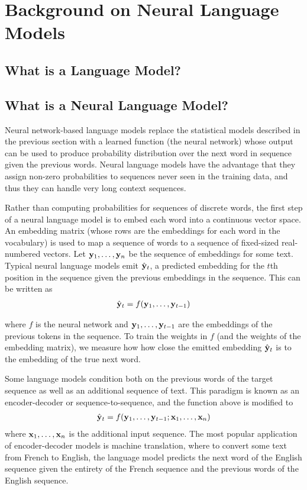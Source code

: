 \chapter{Background on Neural Language Models}
\label{chap:background}

\section{What is a Language Model?}

\section{What is a Neural Language Model?}

Neural network-based language models replace the statistical models described in the previous section with a learned function (the neural network) whose output can be used to produce probability distribution over the next word in sequence given the previous words.
Neural language models have the advantage that they assign non-zero probabilities to sequences never seen in the training data, and thus they can handle very long context sequences.

Rather than computing probabilities for sequences of discrete words, the first step of a neural language model is to embed each word into a continuous vector space.
An embedding matrix (whose rows are the embeddings for each word in the vocabulary) is used to map a sequence of words to a sequence of fixed-sized real-numbered vectors.
Let $\mathbf{y}_1, \ldots, \mathbf{y}_n$ be the sequence of embeddings for some text.
Typical neural language models emit $\hat{\mathbf{y}}_t$, a predicted embedding for the $t$th position in the sequence given the previous embeddings in the sequence. This can be written as
\begin{align}
    \hat{\mathbf{y}}_t = f(\mathbf{y}_1, \ldots, \mathbf{y}_{t-1})
    \label{eq:lm_feq}
\end{align}

where $f$ is the neural network and $\mathbf{y}_1, \ldots, \mathbf{y}_{t-1}$ are the embeddings of the previous tokens in the sequence.
To train the weights in $f$ (and the weights of the embedding matrix), we measure how how close the emitted embedding $\hat{\mathbf{y}}_t$ is to the embedding of the true next word.

Some language models condition both on the previous words of the target sequence as well as an additional sequence of text.
This paradigm is known as an encoder-decoder or sequence-to-sequence, and the function above is modified to
\begin{align}
    \hat{\mathbf{y}}_t = f(\mathbf{y}_1, \ldots, \mathbf{y}_{t-1}; \mathbf{x}_1, \ldots, \mathbf{x}_n)
    \label{eq:cond_lm_feq}
\end{align}
where $\mathbf{x}_1, \ldots, \mathbf{x}_n$ is the additional input sequence. 
The most popular application of encoder-decoder models is machine translation, where to convert some text from French to English, the language model predicts the next word of the English sequence given the entirety of the French sequence and the previous words of the English sequence.

